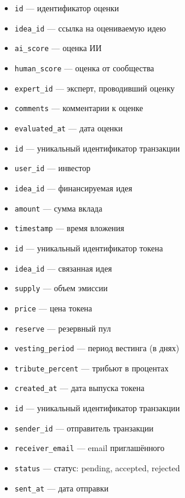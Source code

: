 \documentclass[
    14pt,
    specialist,
    candidate, %
    subf, %
    href,
    dotsinheaders=false
]{disser}
\begin{document}
\begin{itemize}
  \item \texttt{id} --- идентификатор оценки
  \item \texttt{idea\_id} --- ссылка на оцениваемую идею
  \item \texttt{ai\_score} --- оценка ИИ
  \item \texttt{human\_score} --- оценка от сообщества
  \item \texttt{expert\_id} --- эксперт, проводивший оценку
  \item \texttt{comments} --- комментарии к оценке
  \item \texttt{evaluated\_at} --- дата оценки
\end{itemize}

\begin{itemize}
  \item \texttt{id} --- уникальный идентификатор транзакции
  \item \texttt{user\_id} --- инвестор
  \item \texttt{idea\_id} --- финансируемая идея
  \item \texttt{amount} --- сумма вклада
  \item \texttt{timestamp} --- время вложения
\end{itemize}

\begin{itemize}
  \item \texttt{id} --- уникальный идентификатор токена
  \item \texttt{idea\_id} --- связанная идея
  \item \texttt{supply} --- объем эмиссии
  \item \texttt{price} --- цена токена
  \item \texttt{reserve} --- резервный пул
  \item \texttt{vesting\_period} --- период вестинга (в днях)
  \item \texttt{tribute\_percent} --- трибьют в процентах
  \item \texttt{created\_at} --- дата выпуска токена
\end{itemize}

\begin{itemize}
  \item \texttt{id} --- уникальный идентификатор транзакции
  \item \texttt{sender\_id} --- отправитель транзакции
  \item \texttt{receiver\_email} --- email приглашённого
  \item \texttt{status} --- статус: pending, accepted, rejected
  \item \texttt{sent\_at} --- дата отправки
\end{itemize}
\end{document}
